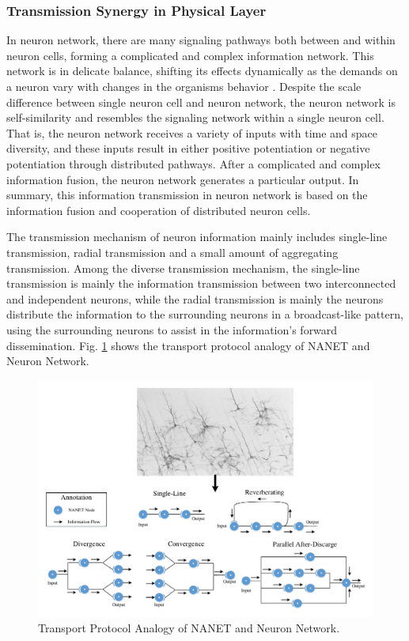 \documentclass[journal,comsoc]{IEEEtran}
\begin{document}
			\subsubsection{Transmission Synergy in Physical Layer}
				In neuron network, there are many signaling pathways both between and within neuron cells, forming a complicated and complex information network. 
				This network is in delicate balance, shifting its effects dynamically as the demands on a neuron vary with changes in the organisms behavior \cite{bear2007neuroscience} .
				Despite the scale difference between single neuron cell and neuron network, the neuron network is self-similarity and resembles the signaling network within a single neuron cell. 
				That is, the neuron network receives a variety of inputs with time and space diversity, and these inputs result in either positive potentiation or negative potentiation through distributed pathways. 
				After a complicated and complex information fusion, the neuron network generates a particular output. 
				In summary, this information transmission in neuron network is based on the information fusion and cooperation of distributed neuron cells.
				
				The transmission mechanism of neuron information mainly includes single-line transmission, radial transmission and a small amount of aggregating transmission.
				Among the diverse transmission mechanism, the single-line transmission is mainly the information transmission between two interconnected and independent neurons, while the radial transmission is mainly the neurons distribute the information to the surrounding neurons in a broadcast-like pattern, using the surrounding neurons to assist in the information's forward dissemination.
				Fig. \ref{fig: transport_pro} shows the transport protocol analogy of NANET and Neuron Network.
				\begin{figure}[htbp]
					\centering
					\includegraphics[width=0.9\linewidth]{figures/tran_protocol.pdf}
					\caption{Transport Protocol Analogy of NANET and Neuron Network.}	
					\label{fig: transport_pro}
				\end{figure}
				
\end{document}
